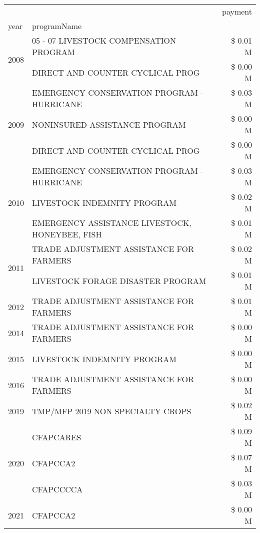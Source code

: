 \begin{tabular}{llr}
\toprule
 &  & payment \\
year & programName &  \\
\midrule
\multirow[t]{2}{*}{2008} & 05 - 07 LIVESTOCK COMPENSATION PROGRAM & \$ 0.01 M \\
 & DIRECT AND COUNTER CYCLICAL PROG & \$ 0.00 M \\
\cline{1-3}
\multirow[t]{3}{*}{2009} & EMERGENCY CONSERVATION PROGRAM - HURRICANE & \$ 0.03 M \\
 & NONINSURED ASSISTANCE PROGRAM & \$ 0.00 M \\
 & DIRECT AND COUNTER CYCLICAL PROG & \$ 0.00 M \\
\cline{1-3}
\multirow[t]{3}{*}{2010} & EMERGENCY CONSERVATION PROGRAM - HURRICANE & \$ 0.03 M \\
 & LIVESTOCK INDEMNITY PROGRAM & \$ 0.02 M \\
 & EMERGENCY ASSISTANCE LIVESTOCK, HONEYBEE, FISH & \$ 0.01 M \\
\cline{1-3}
\multirow[t]{2}{*}{2011} & TRADE ADJUSTMENT ASSISTANCE FOR FARMERS & \$ 0.02 M \\
 & LIVESTOCK FORAGE DISASTER PROGRAM & \$ 0.01 M \\
\cline{1-3}
2012 & TRADE ADJUSTMENT ASSISTANCE FOR FARMERS & \$ 0.01 M \\
\cline{1-3}
2014 & TRADE ADJUSTMENT ASSISTANCE FOR FARMERS & \$ 0.00 M \\
\cline{1-3}
2015 & LIVESTOCK INDEMNITY PROGRAM & \$ 0.00 M \\
\cline{1-3}
2016 & TRADE ADJUSTMENT ASSISTANCE FOR FARMERS & \$ 0.00 M \\
\cline{1-3}
2019 & TMP/MFP 2019 NON SPECIALTY CROPS & \$ 0.02 M \\
\cline{1-3}
\multirow[t]{3}{*}{2020} & CFAPCARES & \$ 0.09 M \\
 & CFAPCCA2 & \$ 0.07 M \\
 & CFAPCCCCA & \$ 0.03 M \\
\cline{1-3}
2021 & CFAPCCA2 & \$ 0.00 M \\
\cline{1-3}
\bottomrule
\end{tabular}

